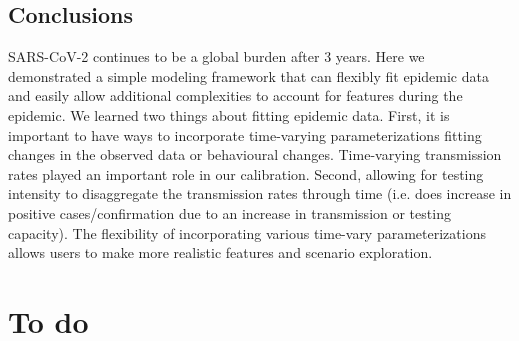 \documentclass[12pt]{article}\usepackage[]{graphicx}\usepackage[]{color}
\begin{document}
\subsection{Conclusions}


SARS-CoV-2 continues to be a global burden after 3 years. 
Here we demonstrated a simple modeling framework that can flexibly fit epidemic data and easily allow additional complexities to account for features during the epidemic. 
We learned two things about fitting epidemic data. 
First, it is important to have ways to incorporate time-varying parameterizations fitting changes in the observed data or behavioural changes. Time-varying transmission rates played an important role in our calibration. 
Second, allowing for testing intensity to disaggregate the transmission rates through time (i.e. does increase in positive cases/confirmation due to an increase in transmission or testing capacity). 
The flexibility of incorporating various time-vary parameterizations allows users to make more realistic features and scenario exploration. 


\thickredline

\clearpage

\section{To do}
\end{document}
